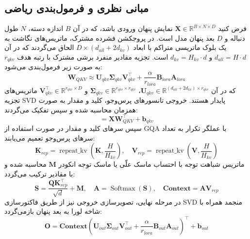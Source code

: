 \subsection{مبانی نظری و فرمول‌بندی ریاضی}
فرض کنید $\mathbf{X} \in \mathbb{R}^{B \times N \times D}$ نمایش پنهان ورودی باشد، که در آن $B$ اندازه دسته، $N$ طول دنباله و $D$ بعد پنهان مدل است. در پروجکشن فشرده مشترک، ماتریس‌های نگاشت به یک بلوک ماتریسی متراکم با ابعاد $D \times (d_{all} + 2 d_{kv})$ الحاق می‌گردند که در آن $d_{all} = H \cdot d$ و $d_{kv} = H_{kv} \cdot d$ است. تجزیه مقادیر منفرد برشی مشترک با رتبه هدف $r_{qkv}$ به صورت زیر فرمول‌بندی می‌شود:
\begin{equation}
\mathbf{W}_{QKV} \approx \mathbf{U}_{qkv} \mathbf{\Sigma}_{qkv} \mathbf{V}_{qkv}^\top + \frac{\alpha}{r_{lora}} \mathbf{B}_{lora} \mathbf{A}_{lora}
\end{equation}
که در آن $\mathbf{U}_{qkv} \in \mathbb{R}^{(d_{all} + 2 d_{kv}) \times r_{qkv}}$، $\mathbf{\Sigma}_{qkv} \in \mathbb{R}^{r_{qkv} \times r_{qkv}}$ و $\mathbf{V}_{qkv}^\top \in \mathbb{R}^{r_{qkv} \times D}$ ماتریس‌های تجزیه SVD پایدار هستند. خروجی تانسورهای پرس‌وجو، کلید و مقدار به صورت همزمان محاسبه شده و سپس تفکیک می‌گردند:
\begin{equation}
[\mathbf{Q}, \mathbf{K}, \mathbf{V}] = \mathbf{X} \mathbf{W}_{QKV}^\top + \mathbf{b}_{qkv}
\end{equation}
سپس سرهای کلید و مقدار در صورت استفاده از GQA با عملگر تکرار به تعداد سرهای پرس‌وجو تعمیم می‌یابند:
\begin{equation}
\mathbf{K}_{rep} = \operatorname{repeat\_kv}(\mathbf{K}, \frac{H}{H_{kv}}), \quad \mathbf{V}_{rep} = \operatorname{repeat\_kv}(\mathbf{V}, \frac{H}{H_{kv}})
\end{equation}
ماتریس شباهت توجه با احتساب ماسک علّی یا ماسک توجه انکودر $\mathbf{M}$ محاسبه شده و با مقادیر ترکیب می‌گردد:
\begin{equation}
\mathbf{S} = \frac{\mathbf{Q} \mathbf{K}_{rep}^\top}{\sqrt{d}} + \mathbf{M}, \quad \mathbf{A} = \operatorname{Softmax}(\mathbf{S}), \quad \mathbf{Context} = \mathbf{A} \mathbf{V}_{rep}
\end{equation}
در مرحله نهایی، تصویرسازی خروجی نیز از طریق فاکتورسازی SVD منجمد همراه با شاخه لورا به بعد پنهان بازمی‌گردد:
\begin{equation}
\mathbf{O} = \mathbf{Context} \left( \mathbf{U}_{out} \mathbf{\Sigma}_{out} \mathbf{V}_{out}^\top + \frac{\alpha}{r_{lora}} \mathbf{B}_{out} \mathbf{A}_{out} \right)^\top + \mathbf{b}_{out}
\end{equation}

